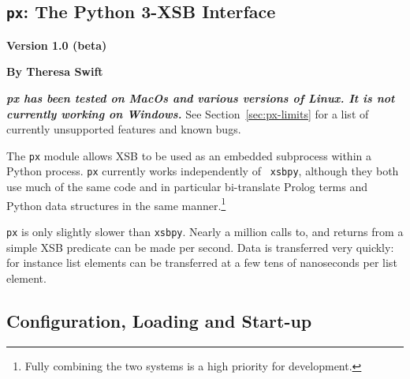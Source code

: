 
\newcommand{\pxversion}{Version 1.0 (beta)}
\newcommand{\px}{{\tt px}}

\begin{center}
\chapter{\px{}: The Python 3-XSB Interface} \label{chap:px}
\end{center}

\vspace*{-.30in} 
\begin{center}
{\Large {\bf  \pxversion}}
\end{center}

\begin{center}
  {\Large {\bf By Theresa Swift}}
\end{center}

\noindent
    {\large {\bf {\em px has been tested on MacOs and various versions of
        Linux. It is not currently working on Windows.}} See
      Section~\ref{sec:px-limits} for a list of currently unsupported
      features and known bugs.}

The \px{} module allows XSB to be used as an embedded subprocess
within a Python process.  \px{} currently works independently of {\tt
  xsbpy}, although they both use much of the same code and in
particular bi-translate Prolog terms and Python data structures in the
same manner.\footnote{Fully combining the two systems is a high
  priority for development.}

\px{} is only slightly slower than {\tt xsbpy}.  Nearly a million
calls to, and returns from a simple XSB predicate can be made per
second.  Data is transferred very quickly: for instance list elements
can be transferred at a few tens of nanoseconds per list element.

\section{Configuration, Loading and Start-up} \label{px:config}


